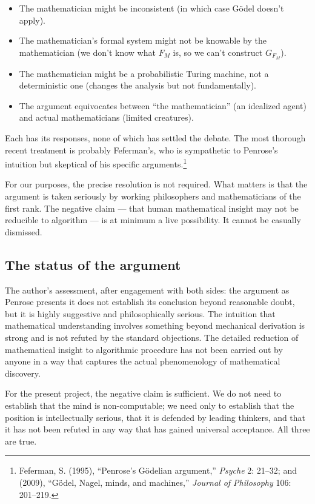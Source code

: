 \begin{itemize}[leftmargin=2em]
    \item The mathematician might be inconsistent (in which case
    G\"odel doesn't apply).
    \item The mathematician's formal system might not be knowable
    by the mathematician (we don't know what $F_M$ is, so we can't
    construct $G_{F_M}$).
    \item The mathematician might be a probabilistic Turing machine,
    not a deterministic one (changes the analysis but not
    fundamentally).
    \item The argument equivocates between ``the mathematician''
    (an idealized agent) and actual mathematicians (limited
    creatures).
\end{itemize}

Each has its responses, none of which has settled the debate. The
most thorough recent treatment is probably Feferman's, who is
sympathetic to Penrose's intuition but skeptical of his specific
arguments.\footnote{Feferman, S. (1995), ``Penrose's G\"odelian
argument,'' \emph{Psyche} 2: 21--32; and (2009), ``G\"odel,
Nagel, minds, and machines,'' \emph{Journal of Philosophy} 106:
201--219.}

For our purposes, the precise resolution is not required. What
matters is that the argument is taken seriously by working
philosophers and mathematicians of the first rank. The negative
claim --- that human mathematical insight may not be reducible to
algorithm --- is at minimum a live possibility. It cannot be
casually dismissed.

\subsection{The status of the argument}

The author's assessment, after engagement with both sides: the
argument as Penrose presents it does not establish its conclusion
beyond reasonable doubt, but it is highly suggestive and
philosophically serious. The intuition that mathematical
understanding involves something beyond mechanical derivation is
strong and is not refuted by the standard objections. The detailed
reduction of mathematical insight to algorithmic procedure has
not been carried out by anyone in a way that captures the actual
phenomenology of mathematical discovery.

For the present project, the negative claim is sufficient. We do not
need to establish that the mind is non-computable; we need only to
establish that the position is intellectually serious, that it is
defended by leading thinkers, and that it has not been refuted in
any way that has gained universal acceptance. All three are true.

